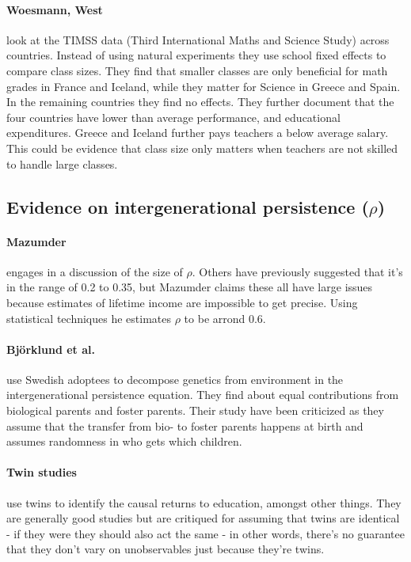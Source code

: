 \documentclass[12pt, a4paper]{article}
\begin{document}
\begin{multicols}{2}
\paragraph{Woesmann, West} look at the TIMSS data (Third International Maths and Science Study) across countries. Instead of using natural experiments they use school fixed effects to compare class sizes. They find that smaller classes are only beneficial for math grades in France and Iceland, while they matter for Science in Greece and Spain. In the remaining countries they find no effects. They further document that the four countries have lower than average performance, and educational expenditures. Greece and Iceland further pays teachers a below average salary. This could be evidence that class size only matters when teachers are not skilled to handle large classes.

\subsection{Evidence on intergenerational persistence ($\rho$)}

\paragraph{Mazumder} engages in a discussion of the size of $\rho$. Others have previously suggested that it's in the range of 0.2 to 0.35, but Mazumder claims these all have large issues because estimates of lifetime income are impossible to get precise. Using statistical techniques he estimates $\rho$ to be arrond 0.6.

\paragraph{Björklund et al.} use Swedish adoptees to decompose genetics from environment in the intergenerational persistence equation. They find about equal contributions from biological parents and foster parents. Their study have been criticized as they assume that the transfer from bio- to foster parents happens at birth and assumes randomness in who gets which children.

\paragraph{Twin studies} use twins to identify the causal returns to education, amongst other things. They are generally good studies but are critiqued for assuming that twins are identical - if they were they should also act the same - in other words, there's no guarantee that they don't vary on unobservables just because they're twins.


\end{multicols}
\end{document}
